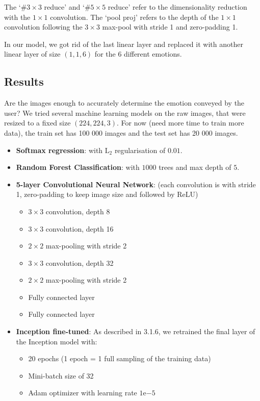 The `\#$3\times3$ reduce' and `\#$5\times5$ reduce' refer to the dimensionality reduction with the $1\times1$ convolution. The `pool proj' refers to the depth of the $1\times1$ convolution following the $3\times3$ max-pool with stride 1 and zero-padding 1.

In our model, we got rid of the last linear layer and replaced it with another linear layer of size $(1, 1, 6)$ for the 6 different emotions.

\newpage
\subsection{Results}
Are the images enough to accurately determine the emotion conveyed by the user? We tried several machine learning models on the raw images, that were resized to a fixed size $(224, 224, 3)$. For now (need more time to train more data), the train set has 100 000 images and the test set has 20 000 images.
\begin{itemize}
    \item \textbf{Softmax regression}: with $\text{L}_2$ regularisation of $0.01$.
    \item \textbf{Random Forest Classification}: with $1000$ trees and max depth of $5$.
    \item \textbf{5-layer Convolutional Neural Network}: (each convolution is with stride 1, zero-padding to keep image size and followed by ReLU)
    \begin{itemize}[topsep=0pt]
        \itemsep-1em
        \item $3\times 3$ convolution, depth 8
        \item $3\times 3$ convolution, depth 16
        \item $2\times 2$ max-pooling with stride 2
        \item $3\times 3$ convolution, depth 32
        \item $2 \times 2$ max-pooling with stride 2
        \item Fully connected layer
        \item Fully connected layer
    \end{itemize}
    \item \textbf{Inception fine-tuned}: As described in 3.1.6, we retrained the final layer of the Inception model with:
    \begin{itemize}[topsep=0pt]
        \itemsep-1em
        \item 20 epochs (1 epoch = 1 full sampling of the training data)
        \item Mini-batch size of 32
        \item Adam optimizer with learning rate $1\mathrm{e}{-5}$
    \end{itemize}
\end{itemize}

